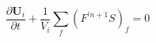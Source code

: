 \documentclass[11pt]{article}
\begin{document}
\LARGE

\begin{equation}
\frac{\partial \textbf{U}_i}{\partial t} + \frac{1}{V_i} \sum_f (F^{'n+1}S)_f = 0
\end{equation}
\end{document}
